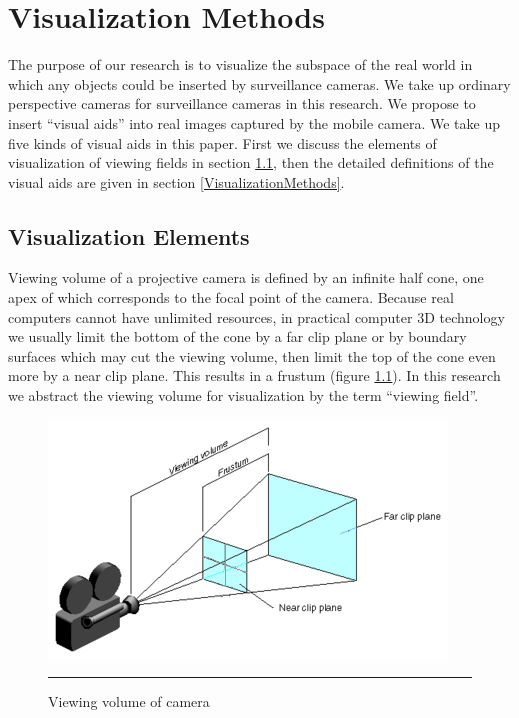 \chapter{Visualization Methods}
\label{Chapter2}

The purpose of our research is to visualize the subspace of the real world in which any objects could be inserted by surveillance cameras. We take up ordinary perspective cameras for surveillance cameras in this research. We propose to insert ``visual aids'' into real images captured by the mobile camera. We take up five kinds of visual aids in this paper. First we discuss the elements of visualization of viewing fields in section \ref{VisualizationRequirements}, then the detailed definitions of the visual aids are given in section \ref{VisualizationMethods}.


\section{Visualization Elements}
\label{VisualizationRequirements}

Viewing volume of a projective camera is defined by an infinite half cone, one apex of which corresponds to the focal point of the camera. Because real computers cannot have unlimited resources, in practical computer 3D technology we usually limit the bottom of the cone by a far clip plane or by boundary surfaces which may cut the viewing volume, then limit the top of the cone even more by a near clip plane. This results in a frustum (figure \ref{fig:ViewingVolume}). In this research we abstract the viewing volume for visualization by the term ``viewing field''.

\begin{figure}[htbp]
	\centering
	\includegraphics{./Primitives/viewing_volume.png}
	\rule{35em}{0.5pt}
	\caption[Viewing volume of camera]{Viewing volume of camera}
	\label{fig:ViewingVolume}
\end{figure}

